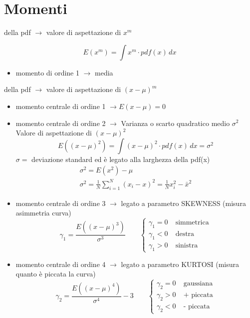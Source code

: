 \documentclass[12pt]{report}
\theoremstyle{remark}
\theoremstyle{theorem}
\begin{document}
\section{Momenti}
	\begin{description}
		\item [Momento di ordine m] della pdf $\to$ valore di aspettazione di $x^m$ 
		\item \[E(x^m) = \int x^m \cdot pdf(x) \, dx\]
		\begin{itemize}
			\item momento di ordine 1 $\to$ media
		\end{itemize}
		\item [Momenti centrali di ordine m] della pdf $\to$ valore di aspettazione di ${(x-\mu)}^m$
		\begin{itemize}
			\item momento centrale di ordine 1 $\to E(x-\mu) =0$
			\item momento centrale di ordine 2 $\to$ Varianza o scarto quadratico medio $\sigma^2$ \newline
				Valore di aspettazione di ${(x-\mu)}^2$
				\[E({(x-\mu)}^2) = \int {(x-\mu)}^2 \cdot pdf(x) \, dx = \sigma^2\]
				$\sigma =$ deviazione standard ed è legato alla larghezza della pdf(x)
				\begin{gather*}
					\sigma^2 = E(x^2)-\mu \\
					\sigma^2 = \frac{1}{N} \sum_{i=1}^{N}{(x_i-x)}^2 = \frac{1}{N}x_i^2-\bar{x}^2
				\end{gather*}	
			\item momento centrale di ordine 3 $\to$ legato a parametro SKEWNESS (misura asimmetria curva)
			\[\gamma_1 = \frac{E({(x-\mu)}^3)}{\sigma^3}\qquad \begin{cases}
				\gamma_1 = 0 \; &\text{simmetrica}\\
				\gamma_1 <0 \; &\text{destra}\\
				\gamma_1 >0 \, &\text{sinistra}
			\end{cases}\]
			\item momento centrale di ordine 4 $\to$ legato a parametro KURTOSI (misura quanto è piccata la curva)
			\[\gamma_2 = \frac{E({(x-\mu)}^4)}{\sigma^4} -3 \qquad \begin{cases}
				\gamma_2= 0 \; & \text{gaussiana} \\
				\gamma_2>0 \; &\text{+ piccata}\\
				\gamma_2<0 \; &\text{- piccata}
			\end{cases}\]			
		\end{itemize}
	\end{description}
\end{document}
